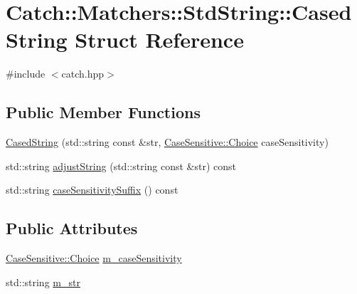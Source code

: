 \hypertarget{structCatch_1_1Matchers_1_1StdString_1_1CasedString}{\section{Catch\-:\-:Matchers\-:\-:Std\-String\-:\-:Cased\-String Struct Reference}
\label{structCatch_1_1Matchers_1_1StdString_1_1CasedString}
}


{\ttfamily \#include $<$catch.\-hpp$>$}

\subsection*{Public Member Functions}
\begin{DoxyCompactItemize}
\item 
\hyperlink{structCatch_1_1Matchers_1_1StdString_1_1CasedString_aa88bbc5acd2bff22351d8d4b1816b561}{Cased\-String} (std\-::string const \&str, \hyperlink{structCatch_1_1CaseSensitive_aad49d3aee2d97066642fffa919685c6a}{Case\-Sensitive\-::\-Choice} case\-Sensitivity)
\item 
std\-::string \hyperlink{structCatch_1_1Matchers_1_1StdString_1_1CasedString_a0ff84e194426c8f4bca0660b9180d20d}{adjust\-String} (std\-::string const \&str) const 
\item 
std\-::string \hyperlink{structCatch_1_1Matchers_1_1StdString_1_1CasedString_a1113c80dd02967032a99290bdcd1b590}{case\-Sensitivity\-Suffix} () const 
\end{DoxyCompactItemize}
\subsection*{Public Attributes}
\begin{DoxyCompactItemize}
\item 
\hyperlink{structCatch_1_1CaseSensitive_aad49d3aee2d97066642fffa919685c6a}{Case\-Sensitive\-::\-Choice} \hyperlink{structCatch_1_1Matchers_1_1StdString_1_1CasedString_ae1c2864c986941536a6e94cca0528f92}{m\-\_\-case\-Sensitivity}
\item 
std\-::string \hyperlink{structCatch_1_1Matchers_1_1StdString_1_1CasedString_ad05dbc99aba3c3c386d6b856b213f911}{m\-\_\-str}
\end{DoxyCompactItemize}


